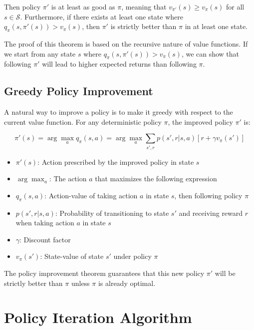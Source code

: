 \documentclass{article}
\begin{document}
Then policy $\pi'$ is at least as good as $\pi$, meaning that $v_{\pi'}(s) \geq v_\pi(s)$ for all $s \in \mathcal{S}$. Furthermore, if there exists at least one state where $q_\pi(s, \pi'(s)) > v_\pi(s)$, then $\pi'$ is strictly better than $\pi$ in at least one state.

The proof of this theorem is based on the recursive nature of value functions. If we start from any state $s$ where $q_\pi(s, \pi'(s)) > v_\pi(s)$, we can show that following $\pi'$ will lead to higher expected returns than following $\pi$.

\subsection{Greedy Policy Improvement}

A natural way to improve a policy is to make it greedy with respect to the current value function. For any deterministic policy $\pi$, the improved policy $\pi'$ is:

\begin{equation}
\pi'(s) = \arg\max_a q_\pi(s,a) = \arg\max_a \sum_{s',r} p(s',r|s,a)[r + \gamma v_\pi(s')]
\end{equation}

\begin{tcolorbox}[colframe=blue!50!black, colback=blue!10, title=Notation Overview]
\begin{itemize}
    \item $\pi'(s)$: Action prescribed by the improved policy in state $s$
    \item $\arg\max_a$: The action $a$ that maximizes the following expression
    \item $q_\pi(s,a)$: Action-value of taking action $a$ in state $s$, then following policy $\pi$
    \item $p(s',r|s,a)$: Probability of transitioning to state $s'$ and receiving reward $r$ when taking action $a$ in state $s$
    \item $\gamma$: Discount factor
    \item $v_\pi(s')$: State-value of state $s'$ under policy $\pi$
\end{itemize}
\end{tcolorbox}

The policy improvement theorem guarantees that this new policy $\pi'$ will be strictly better than $\pi$ unless $\pi$ is already optimal.

\section{Policy Iteration Algorithm}
\end{document}
